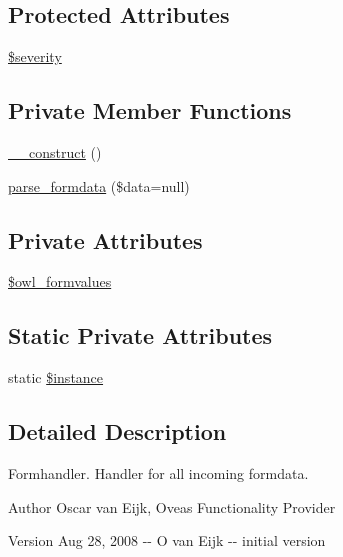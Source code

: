 \subsection*{Protected Attributes}
\begin{DoxyCompactItemize}
\item 
\hyperlink{class__OWL_ad26b40a9dbbacb33e299b17826f8327c}{\$severity}
\end{DoxyCompactItemize}
\subsection*{Private Member Functions}
\begin{DoxyCompactItemize}
\item 
\hyperlink{classFormHandler_a1ef7ad4fe143dd8339c8ab66423a1934}{\_\-\_\-construct} ()
\item 
\hyperlink{classFormHandler_aef73c198dbc5de4e84f6c2a23b8b294c}{parse\_\-formdata} (\$data=null)
\end{DoxyCompactItemize}
\subsection*{Private Attributes}
\begin{DoxyCompactItemize}
\item 
\hyperlink{classFormHandler_a2caca98eec368ff030f07f8024253527}{\$owl\_\-formvalues}
\end{DoxyCompactItemize}
\subsection*{Static Private Attributes}
\begin{DoxyCompactItemize}
\item 
static \hyperlink{classFormHandler_a54efe3849e4065053f0eb0313356d072}{\$instance}
\end{DoxyCompactItemize}


\subsection{Detailed Description}
Formhandler. Handler for all incoming formdata. \begin{DoxyAuthor}{Author}
Oscar van Eijk, Oveas Functionality Provider 
\end{DoxyAuthor}
\begin{DoxyVersion}{Version}
Aug 28, 2008 -\/-\/ O van Eijk -\/-\/ initial version 
\end{DoxyVersion}


